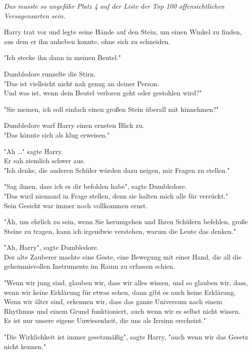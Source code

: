{\emph{Das musste so ungefähr Platz 4 auf der Liste der Top 100 offensichtlichen Versagensarten sein.}

Harry trat vor und legte seine Hände auf den Stein, um einen Winkel zu finden, aus dem er ihn anheben konnte, ohne sich zu schneiden.

"Ich stecke ihn dann in meinen Beutel."

Dumbledore runzelte die Stirn.\\ "Das ist vielleicht nicht nah genug an deiner Person.\\ Und was ist, wenn dein Beutel verloren geht oder gestohlen wird?"

"Sie meinen, ich soll einfach einen großen Stein überall mit hinnehmen?"

Dumbledore warf Harry einen ernsten Blick zu.\\ "Das könnte sich als klug erweisen."

"Ah …" sagte Harry.\\ Er sah ziemlich schwer aus.\\ "Ich denke, die anderen Schüler würden dazu neigen, mir Fragen zu stellen."

"Sag ihnen, dass ich es dir befohlen habe", sagte Dumbledore.\\ "Das wird niemand in Frage stellen, denn sie halten mich alle für verrückt."\\ Sein Gesicht war immer noch vollkommen ernst.

"Äh, um ehrlich zu sein, wenn Sie herumgehen und Ihren Schülern befehlen, große Steine zu tragen, kann ich irgendwie verstehen, warum die Leute das denken."

"Ah, Harry", sagte Dumbledore.\\ Der alte Zauberer machte eine Geste, eine Bewegung mit einer Hand, die all die geheimnisvollen Instrumente im Raum zu erfassen schien.

"Wenn wir jung sind, glauben wir, dass wir alles wissen, und so glauben wir, dass, wenn wir keine Erklärung für etwas sehen, dann gibt es auch keine Erklärung.\\ Wenn wir älter sind, erkennen wir, dass das ganze Universum nach einem Rhythmus und einem Grund funktioniert, auch wenn wir es selbst nicht wissen.\\ Es ist nur unsere eigene Unwissenheit, die uns als Irrsinn erscheint."

"Die Wirklichkeit ist immer gesetzmäßig", sagte Harry, "auch wenn wir das Gesetz nicht kennen."

}
